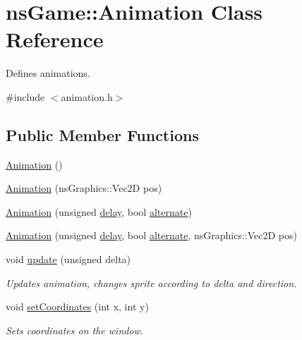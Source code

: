 \hypertarget{classns_game_1_1_animation}{}\section{ns\+Game\+:\+:Animation Class Reference}
\label{classns_game_1_1_animation}


Defines animations.  




{\ttfamily \#include $<$animation.\+h$>$}

\subsection*{Public Member Functions}
\begin{DoxyCompactItemize}
\item 
\hyperlink{classns_game_1_1_animation_aebaabfa10569678e6a7d30fa9c8d031d}{Animation} ()
\item 
\hyperlink{classns_game_1_1_animation_a0554455321614f3f94bbcbd5b784cfd5}{Animation} (ns\+Graphics\+::\+Vec2D pos)
\item 
\hyperlink{classns_game_1_1_animation_a022c8e1738aee4ce2e2c15abbeedc711}{Animation} (unsigned \hyperlink{classns_game_1_1_animation_abde2f282d6d865a253f0a6edc0964508}{delay}, bool \hyperlink{classns_game_1_1_animation_a3f119a84e6993f0676c9cde2b84a61dd}{alternate})
\item 
\hyperlink{classns_game_1_1_animation_a0170b0eeb1b1f41d4f0a5270877e9897}{Animation} (unsigned \hyperlink{classns_game_1_1_animation_abde2f282d6d865a253f0a6edc0964508}{delay}, bool \hyperlink{classns_game_1_1_animation_a3f119a84e6993f0676c9cde2b84a61dd}{alternate}, ns\+Graphics\+::\+Vec2D pos)
\item 
void \hyperlink{classns_game_1_1_animation_a5f32b1fc6ad5d228a4153d7421fa457b}{update} (unsigned delta)
\begin{DoxyCompactList}\small\item\em Updates animation, changes sprite according to delta and direction. \end{DoxyCompactList}\item 
void \hyperlink{classns_game_1_1_animation_a626733cd1a3031caf438b656f1d805cd}{set\+Coordinates} (int x, int y)
\begin{DoxyCompactList}\small\item\em Sets coordinates on the window. \end{DoxyCompactList}\item 

\end{DoxyCompactItemize}
